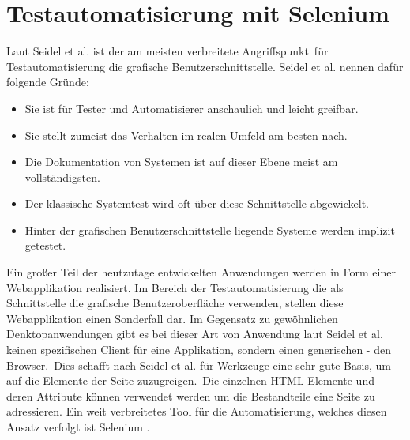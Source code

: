 \chapter{Testautomatisierung mit Selenium}
\label{sec:testautomatisierung_mit_selenium}

Laut Seidel et al. \cite[vgl. S. 48]{seidl_basiswissen_2012} ist der am meisten verbreitete \frqq Angriffspunkt\flqq\ für Testautomatisierung die grafische Benutzerschnittstelle. Seidel et al. \cite[S. 48]{seidl_basiswissen_2012} nennen dafür folgende Gründe:
\begin{itemize}
\item \glqq Sie ist für Tester und Automatisierer anschaulich und leicht greifbar.\grqq
\item \glqq Sie stellt zumeist das Verhalten im realen Umfeld am besten nach.\grqq
\item \glqq Die Dokumentation von Systemen ist auf dieser Ebene meist am vollständigsten.\grqq
\item \glqq Der klassische Systemtest wird oft über diese Schnittstelle abgewickelt.\grqq
\item \glqq Hinter der grafischen Benutzerschnittstelle liegende Systeme werden implizit getestet.\grqq
\end{itemize}
Ein großer Teil der heutzutage entwickelten Anwendungen werden in Form einer Webapplikation realisiert. Im Bereich der Testautomatisierung die als Schnittstelle die grafische Benutzeroberfläche verwenden, stellen diese Webapplikation einen Sonderfall dar.
Im Gegensatz zu gewöhnlichen Denktopanwendungen gibt es bei dieser Art von Anwendung laut Seidel et al. \cite[vgl. S. 88]{seidl_basiswissen_2012} \glqq keinen spezifischen Client für eine Applikation, sondern einen generischen - den Browser.\grqq\ Dies schafft nach Seidel et al.  \cite[vgl. S. 59]{seidl_basiswissen_2012} \glqq für Werkzeuge eine sehr gute Basis, um auf die Elemente der Seite zuzugreigen.\grqq\ Die einzelnen HTML-Elemente und deren Attribute können verwendet werden um die Bestandteile eine Seite zu adressieren.
Ein weit verbreitetes Tool für die Automatisierung, welches diesen Ansatz verfolgt ist Selenium \cite{selenium_selenium_2015}.
